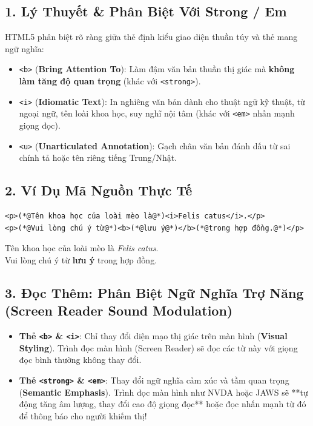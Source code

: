 \documentclass[11pt,oneside]{book}
\newcommand{\codeinline}[1]{\textcolor{accentOrange}{\texttt{#1}}}
\newcommand{\term}[1]{\textbf{\textcolor{primaryBlue}{#1}}}
\begin{document}
\subsection{1. Lý Thuyết \& Phân Biệt Với Strong / Em}
HTML5 phân biệt rõ ràng giữa thẻ định kiểu giao diện thuần túy và thẻ mang ngữ nghĩa:
\begin{itemize}
    \item \codeinline{<b>} (\term{Bring Attention To}): Làm đậm văn bản thuần thị giác mà \textbf{không làm tăng độ quan trọng} (khác với \codeinline{<strong>}).
    \item \codeinline{<i>} (\term{Idiomatic Text}): In nghiêng văn bản dành cho thuật ngữ kỹ thuật, từ ngoại ngữ, tên loài khoa học, suy nghĩ nội tâm (khác với \codeinline{<em>} nhấn mạnh giọng đọc).
    \item \codeinline{<u>} (\term{Unarticulated Annotation}): Gạch chân văn bản đánh dấu từ sai chính tả hoặc tên riêng tiếng Trung/Nhật.
\end{itemize}

\subsection{2. Ví Dụ Mã Nguồn Thực Tế}
\begin{codeWindow}
\begin{lstlisting}[language=HTML5]
<p>(*@Tên khoa học của loài mèo là@*)<i>Felis catus</i>.</p>
<p>(*@Vui lòng chú ý từ@*)<b>(*@lưu ý@*)</b>(*@trong hợp đồng.@*)</p>
\end{lstlisting}
\end{codeWindow}

\begin{browserWindow}
\sffamily\small
Tên khoa học của loài mèo là \textit{Felis catus}.\\[4pt]
Vui lòng chú ý từ \textbf{lưu ý} trong hợp đồng.
\end{browserWindow}

\subsection{3. Đọc Thêm: Phân Biệt Ngữ Nghĩa Trợ Năng (Screen Reader Sound Modulation)}

\begin{tipBox}
\begin{itemize}[leftmargin=1.5em, itemsep=4pt]
    \item \textbf{Thẻ \codeinline{<b>} \& \codeinline{<i>}}: Chỉ thay đổi diện mạo thị giác trên màn hình (\term{Visual Styling}). Trình đọc màn hình (Screen Reader) sẽ đọc các từ này với giọng đọc bình thường không thay đổi.
    \item \textbf{Thẻ \codeinline{<strong>} \& \codeinline{<em>}}: Thay đổi ngữ nghĩa cảm xúc và tầm quan trọng (\term{Semantic Emphasis}). Trình đọc màn hình như NVDA hoặc JAWS sẽ **tự động tăng âm lượng, thay đổi cao độ giọng đọc** hoặc đọc nhấn mạnh từ đó để thông báo cho người khiếm thị!
\end{itemize}
\end{tipBox}
\end{document}
